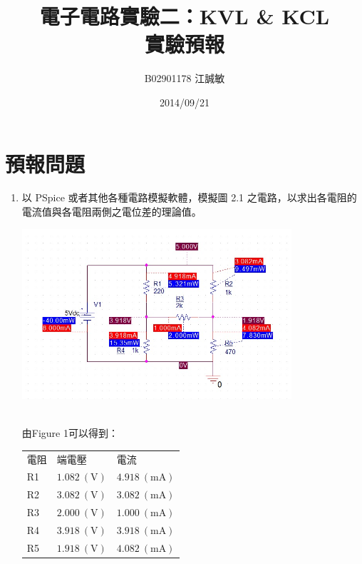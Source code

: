 \documentclass[12pt, a4paper]{article}
\title{ \bf {\Huge 電子電路實驗二：KVL \& KCL}\\ 實驗預報}
\author{B02901178 江誠敏}
\date{2014/09/21}
\def\large{\fontsize{14}{21}\selectfont}
\newcommand{\unit}[1]{\:(\text{#1})}
\begin{document}
\maketitle

\section{預報問題}

\begin{enumerate}[itemsep=20pt, topsep=10pt]
	\item {\large 以 PSpice 或者其他各種電路模擬軟體，模擬圖 2.1 之電路，以求出各電阻的電流值與各電阻兩側之電位差的理論值。} \\[10pt]
\parbox{\linewidth}{\centering
		\includegraphics[width=10cm]{data/a1.jpg}
	} \\[10pt]
由Figure 1可以得到：
\begin{center}
\begin{tabular}{|p{4cm}|p{4cm}|p{4cm}|}
	\hline
	電阻 & 端電壓 & 電流 \\
	\hhline{|=|=|=|}
	R1 & $1.082 \unit{V}$ & $4.918 \unit{mA}$ \\
	\hline
	R2 & $3.082 \unit{V}$ & $3.082 \unit{mA}$ \\
	\hline
	R3 & $2.000 \unit{V}$ & $1.000 \unit{mA}$ \\
	\hline
	R4 & $3.918 \unit{V}$ & $3.918 \unit{mA}$ \\
	\hline
	R5 & $1.918 \unit{V}$ & $4.082 \unit{mA}$ \\
	\hline
\end{tabular}
\end{center}


\end{enumerate}
\end{document}
